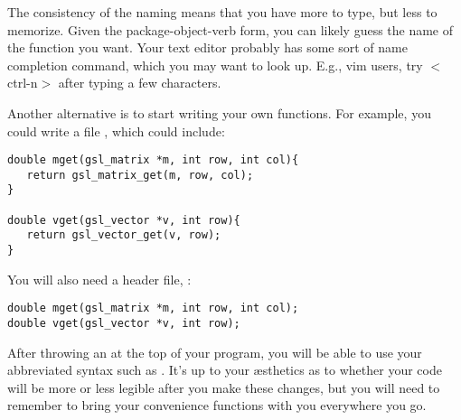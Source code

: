 The consistency of the naming means that you have more to type, but
less to memorize. Given the package-object-verb form, you can likely
guess the name of the function you want. Your text editor probably has
some sort of name completion command, which you may want to look up. E.g.,
vim users, try $<$ctrl-n$>$ after typing a few characters.

Another alternative is to start writing your own functions. For example, you
could write a file , which could include:

\begin{lstlisting}
double mget(gsl_matrix *m, int row, int col){
   return gsl_matrix_get(m, row, col);
}

double vget(gsl_vector *v, int row){
   return gsl_vector_get(v, row);
}
\end{lstlisting}

You will also need a header file, :
\begin{lstlisting}
double mget(gsl_matrix *m, int row, int col);
double vget(gsl_vector *v, int row);
\end{lstlisting}

After throwing an  at the top of your
program, you will be able to use your abbreviated syntax such as .
It's up to your \ae sthetics as to whether your code will be more or less
legible after you make these changes, but you will need to remember to
bring your convenience functions with you everywhere you go.


